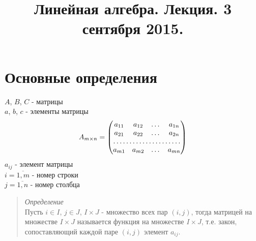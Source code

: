 \documentclass[11pt]{proc}
\title{Линейная алгебра. Лекция. 3 сентября 2015.}
\begin{document}
\pagestyle{empty}
\maketitle

\section{Основные определения}
$A$, $B$, $C$ - матрицы\\
$a$, $b$, $c$ - элементы матрицы
\[	
A_{m\times n} = \begin{pmatrix}
		a_{11} & a_{12} & \dots & a_{1n}\\
		a_{21} & a_{22} & \dots & a_{2n}\\
		\hdotsfor{4}\\
		a_{m1} & a_{m2} & \dots & a_{mn}\\
	\end{pmatrix}
\]
$a_{ij}$ - элемент матрицы\\
$i = \overline{1,m}$ - номер строки\\
$j = \overline{1,n}$ - номер столбца\\
\begin{quote}
	\emph{Определение}\\
	Пусть $i \in I$, $j \in J$, $I \times J$ - множество всех пар $(i,j)$, тогда матрицей на множестве $I \times J$ называется функция на множестве $I \times J$, т.е. закон, сопоставляющий каждой паре $(i,j)$ элемент $a_{ij}$.
\end{quote}
\end{document}
